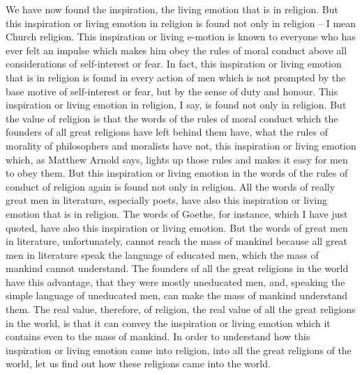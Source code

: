 We have now found the inspiration, the living emotion that is in religion. But this inspiration or living emotion in religion is found not only in religion -- I mean Church religion.
This inspiration or living e-motion is known to everyone who has ever felt an impulse which makes him obey the rules of moral conduct above all considerations of self-interest or fear.
In fact, this inspiration or living emotion that is in religion is found in every action of men which is not prompted by the base motive of self-interest or fear, but by the sense of duty and honour.
This inspiration or living emotion in religion, I say, is found not only in religion.
But the value of religion is that the words of the rules of moral conduct which the founders of all great religions have left behind them have, what the rules of morality of philosophers and moralists have not, this inspiration or living emotion which, as Matthew Arnold says, lights up those rules and makes it easy for men to obey them. But this inspiration or living emotion in the words of the rules of conduct of religion again is found not only in religion.
All the words of really great men in literature, especially poets, have also this inspiration or living emotion that is in religion. The words of Goethe, for instance, which I have just quoted, have also this inspiration or living emotion. But the words of great men in literature, unfortunately, cannot reach the mass of mankind because all great men in literature speak the language of educated men, which the mass of mankind cannot understand. The founders of all the great religions in the world have this advantage, that they were mostly uneducated men, and, speaking the simple language of uneducated men, can make the mass of mankind understand them.
The real value, therefore, of religion, the real value of all the great religions in the world, is that it can convey the inspiration or living emotion which it contains even to the mass of mankind.
In order to understand how this inspiration or living emotion came into religion, into all the great religions of the world, let us find out how these religions came into the world.

